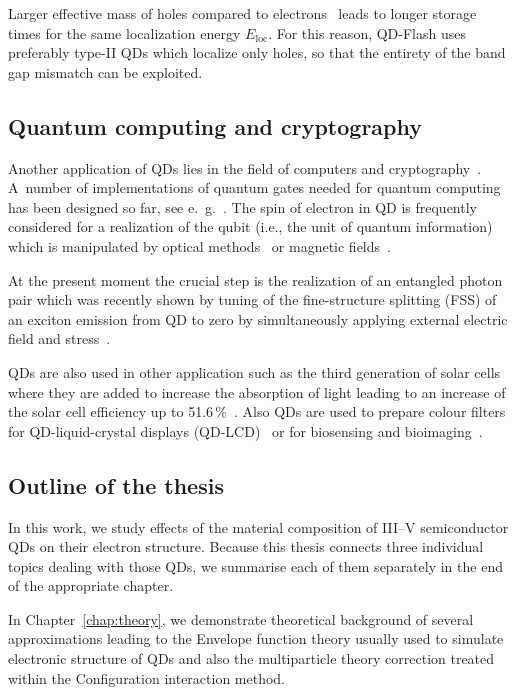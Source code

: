 \documentclass[
a4paper, %
11pt, %
onecolumn, %
openany, %
oldfontcommands,
]{memoir}
\begin{document}
Larger effective mass of holes compared to electrons~\cite{sze} leads to longer storage times for the same localization energy $E_\mathrm{loc}$. For this reason, QD-Flash uses preferably type-II QDs which localize only holes, so that the entirety of the band gap mismatch can be exploited.

\subsection*{Quantum computing and cryptography}
Another application of QDs lies in the field of computers and cryptography~\cite{Feynman,Deutsch,Loss}. A~number of implementations of quantum gates needed for quantum computing has been designed so far, see e.~g.~\cite{Bennett}. The spin of electron in QD is frequently considered for a realization of the qubit (i.e., the unit of quantum information)~\cite{Loss} which is manipulated by optical methods~\cite{Hafenbrak} or magnetic fields~\cite{Burkard}. 

At the present moment the crucial step is the realization of an entangled photon pair which was recently shown by tuning of the fine-structure splitting (FSS) of an exciton emission from QD to zero by simultaneously applying external electric field and stress~\cite{Trotta}.

\vspace{0.2cm}
QDs are also used in other application such as the third generation of solar cells where they are added to increase the absorption of light leading to an increase of the solar cell efficiency up to 51.6$\,\%$~\cite{Jiang_NonoEn2015_QDsolarcell}. Also QDs are used to prepare colour filters for QD-liquid-crystal displays (QD-LCD)~\cite{Chen_IEEE_2017_QLED} or for biosensing and bioimaging~\cite{Li_JMaterChemB_2014_biosensing}.

\subsection*{Outline of the thesis}
\vspace{0.2cm}
In this work, we study effects of the material composition of III--V semiconductor QDs on their electron structure. Because this thesis connects three individual topics dealing with those QDs, we summarise each of them separately in the end of the appropriate chapter.

In Chapter~\ref{chap:theory}, we demonstrate theoretical background of several approximations leading to the Envelope function theory usually used to simulate electronic structure of QDs and also the multiparticle theory correction treated within the Configuration interaction method.
\end{document}

